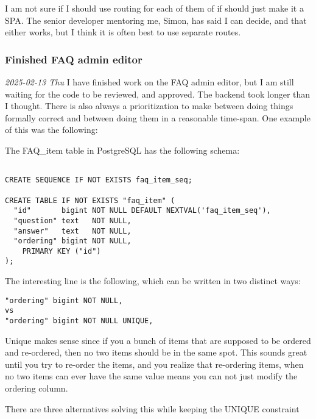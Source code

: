 \documentclass[../main.tex]{subfiles}
\begin{document}
I am not sure if I should use routing for each of them of if should just make it a SPA. The senior developer mentoring me, Simon, has said I can decide, and that either works, but I think it is often best to use separate routes.

\subsubsection{Finished FAQ admin editor}

\textit{2025-02-13 Thu} I have finished work on the FAQ admin editor, but I am still waiting for the code to be reviewed, and approved. The backend took longer than I thought. There is also always a prioritization to make between doing things formally correct and between doing them in a reasonable time-span. One example of this was the following:

The FAQ\_item table in PostgreSQL has the following schema:

\begin{verbatim}
    
CREATE SEQUENCE IF NOT EXISTS faq_item_seq;
  
CREATE TABLE IF NOT EXISTS "faq_item" ( 
  "id"       bigint NOT NULL DEFAULT NEXTVAL('faq_item_seq'),
  "question" text   NOT NULL,
  "answer"   text   NOT NULL,
  "ordering" bigint NOT NULL,
    PRIMARY KEY ("id")
);

\end{verbatim}

The interesting line is the following, which can be written in two distinct ways:

\begin{verbatim}
"ordering" bigint NOT NULL,
vs
"ordering" bigint NOT NULL UNIQUE,
\end{verbatim}

Unique makes sense since if you a bunch of items that are supposed to be ordered and re-ordered, then no two items should be in the same spot. This sounds great until you try to re-order the items, and you realize that re-ordering items, when no two items can ever have the same value means you can not just modify the ordering column.

There are three alternatives solving this while keeping the UNIQUE constraint
\end{document}
